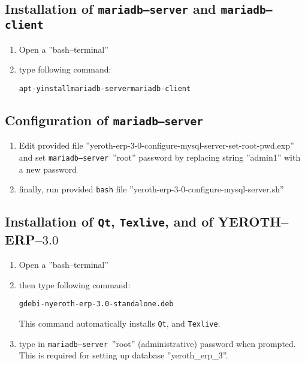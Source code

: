 \documentclass[a4paper, 10pt]{article}
\newcommand{\texlive}{\texttt{Texlive}\xspace}
\newcommand{\bash}{\texttt{bash}\xspace}
\newcommand{\qt}{\texttt{Qt}\xspace}
\newcommand{\mariadbserver}{\texttt{mariadb--server}\xspace}
\newcommand{\mariadbclient}{\texttt{mariadb--client}\xspace}
\newcommand{\yerotherptroiszero}{\textcolor{yerenColorBlue}{\sc YEROTH--ERP--$3.0$}\xspace}
\newcommand{\rootcommand}[1]{
\begin{center}
\textcolor{purplish}{#1\xspace}
\end{center}}
\begin{document}
\subsection{Installation of \mariadbserver and \mariadbclient}

\begin{enumerate}[1)]
	\item Open a ''bash--terminal''
	\item type following command:
		\begin{alltt}
			\rootcommand{apt -y install mariadb-server mariadb-client}
		\end{alltt}		
\end{enumerate} 

\subsection{Configuration of \mariadbserver}

\begin{enumerate}[1)]
	\item Edit provided file ''yeroth-erp-3-0-configure-mysql-server-set-root-pwd.exp''
		and set \mariadbserver\ ''root'' password by replacing string 
		''admin1'' with a new password
	\item finally, run provided \bash file
		''yeroth-erp-3-0-configure-mysql-server.sh''	
\end{enumerate}

\subsection{Installation of \qt, \texlive, and of \yerotherptroiszero}

\begin{enumerate}[1)]
	\item Open a ''bash--terminal''

	\item then type following command:
		\begin{alltt}
			\rootcommand{gdebi -n yeroth-erp-3.0-standalone.deb}
		\end{alltt}

	This command automatically installs \qt, and \texlive.
		
	\item type in \mariadbserver\ ''root'' (administrative)
		password when prompted. This is required
		for setting up  database ''yeroth\_erp\_3''.
\end{enumerate}
\end{document}
